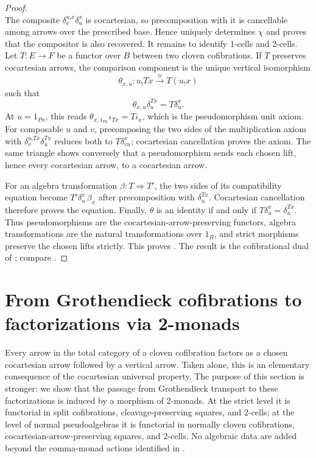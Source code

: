 \documentclass[11pt]{article}
\theoremstyle{plain}
\theoremstyle{definition}
\theoremstyle{remark}
\numberwithin{equation}{section}
\begin{document}
\begin{proof}
\begin{equation}
\end{equation}
The composite $\delta^{u_!x}_v\delta^x_u$ is cocartesian, so
precomposition with it is cancellable among arrows over the prescribed
base.  Hence  uniquely determines
$\chi$ and proves that the compositor is also recovered.
It remains to identify 1-cells and 2-cells.  Let $T\colon E\to F$ be a
functor over $B$ between two cloven cofibrations.  If $T$ preserves
cocartesian arrows, the comparison component is the unique vertical
isomorphism
\begin{equation}
  \theta_{x,u}\colon u_!Tx\xrightarrow{\ \cong\ }T(u_!x)
  \label{eq:fixed-base-pseudomorphism-comparison}
\end{equation}
such that
\begin{equation}
  \theta_{x,u}\delta^{Tx}_u=T\delta^x_u.
  \label{eq:fixed-base-pseudomorphism-triangle}
\end{equation}
At $u=1_{Px}$, this reads
$\theta_{x,1_{Px}}\iota_{Tx}=T\iota_x$, which is the pseudomorphism
unit axiom.  For composable $u$ and $v$, precomposing the two sides of
the multiplication axiom with
$\delta^{u_!Tx}_v\delta^{Tx}_u$ reduces both to
$T\delta^x_{vu}$; cocartesian cancellation proves the axiom.  The
same triangle shows conversely that a pseudomorphism sends each chosen
lift, hence every cocartesian arrow, to a cocartesian arrow.

For an algebra transformation $\beta\colon T\Rightarrow T'$, the two
sides of its compatibility equation become
$T'\delta^x_u\,\beta_x$ after precomposition with $\delta^{Tx}_u$.
Cocartesian cancellation therefore proves the equation.  Finally,
$\theta$ is an identity if and only if
$T\delta^x_u=\delta^{Tx}_u$.  Thus pseudomorphisms are the
cocartesian-arrow-preserving functors, algebra transformations are the natural
transformations over $1_B$, and strict morphisms preserve the chosen
lifts strictly.  This proves
.  The result is the
cofibrational dual of \citet{Street1974}; compare
\citet[Theorem~2.6]{EmmeneggerEtAl2024}.
\end{proof}

\section{From Grothendieck cofibrations to factorizations via 2-monads}
\label{sec:squaring}

Every arrow in the total category of a cloven cofibration factors as a
chosen cocartesian arrow followed by a vertical arrow.  Taken alone,
this is an elementary consequence of the cocartesian universal
property.  The purpose of this section is stronger: we show that the
passage from Grothendieck transport to these factorizations is induced
by a morphism of 2-monads.  At the strict level it is functorial in
split cofibrations, cleavage-preserving squares, and 2-cells; at the
level of normal pseudoalgebras it is functorial in normally cloven cofibrations,
cocartesian-arrow-preserving squares, and 2-cells.  No algebraic data
are added beyond the comma-monad actions identified in
.
\end{document}
